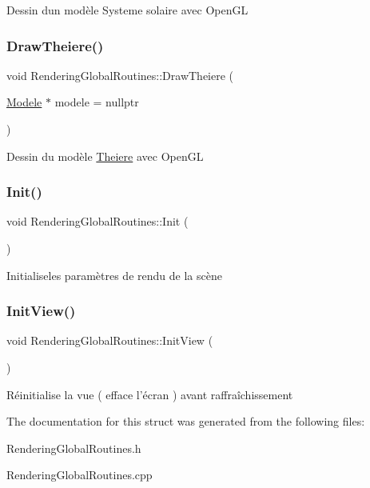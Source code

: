 Dessin d\textquotesingle{}un modèle Systeme solaire avec Open\+GL \mbox{\label{structRenderingGlobalRoutines_a13f7fddc36582fe3bbba36c61f75153a}} 
\subsubsection{\texorpdfstring{DrawTheiere()}{DrawTheiere()}}
{\footnotesize\ttfamily void Rendering\+Global\+Routines\+::\+Draw\+Theiere (\begin{DoxyParamCaption}\item[{\mbox{\hyperlink{classModele}{Modele}} $\ast$}]{modele = {\ttfamily nullptr} }\end{DoxyParamCaption})\hspace{0.3cm}{\ttfamily [static]}}

Dessin du modèle \mbox{\hyperlink{classTheiere}{Theiere}} avec Open\+GL \mbox{\label{structRenderingGlobalRoutines_adb0a8e5310950bc9675342df59998fc5}} 
\subsubsection{\texorpdfstring{Init()}{Init()}}
{\footnotesize\ttfamily void Rendering\+Global\+Routines\+::\+Init (\begin{DoxyParamCaption}{ }\end{DoxyParamCaption})\hspace{0.3cm}{\ttfamily [static]}}

Initialiseles paramètres de rendu de la scène \mbox{\label{structRenderingGlobalRoutines_a4e853aeabd168692f76824ae8c0f9624}} 
\subsubsection{\texorpdfstring{InitView()}{InitView()}}
{\footnotesize\ttfamily void Rendering\+Global\+Routines\+::\+Init\+View (\begin{DoxyParamCaption}{ }\end{DoxyParamCaption})\hspace{0.3cm}{\ttfamily [static]}}

Réinitialise la vue ( efface l’écran ) avant raffraîchissement 

The documentation for this struct was generated from the following files\+:\begin{DoxyCompactItemize}
\item 
Rendering\+Global\+Routines.\+h\item 
Rendering\+Global\+Routines.\+cpp\end{DoxyCompactItemize}

